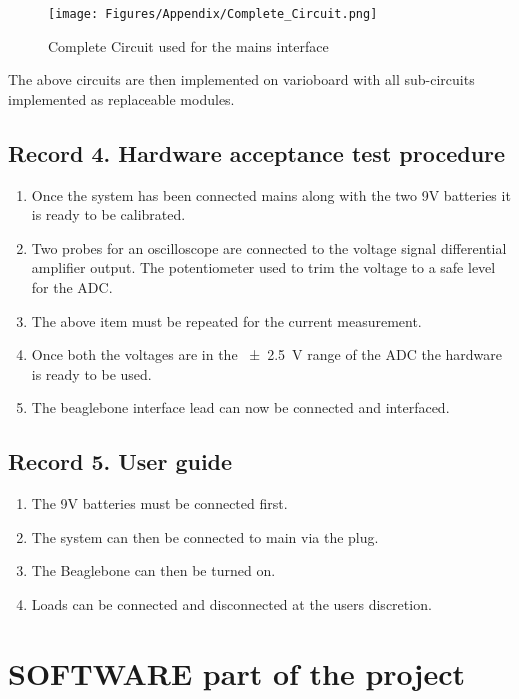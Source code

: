 \begin{figure}[H]
    \centering
    \texttt{[image: Figures/Appendix/Complete\_Circuit.png]}
    \caption{Complete Circuit used for the mains interface}
    \label{ap:Full}
\end{figure}

The above circuits are then implemented on varioboard with all sub-circuits implemented as replaceable modules.

\subsection{Record 4. Hardware acceptance test procedure}

\begin{enumerate}
    \item Once the system has been connected mains along with the two 9V batteries it is ready to be calibrated.
    \item Two probes for an oscilloscope are connected to the voltage signal differential amplifier output. The potentiometer used to trim the voltage to a safe level for the ADC.
    \item The above item must be repeated for the current measurement.
    \item Once both the voltages are in the \qty{\pm 2.5}{\volt} range of the ADC the hardware is ready to be used.
    \item The beaglebone interface lead can now be connected and interfaced.
\end{enumerate}
\subsection{Record 5. User guide}

\begin{enumerate}
    \item The 9V batteries must be connected first.
    \item The system can then be connected to main via the plug.
    \item The Beaglebone can then be turned on.
    \item Loads can be connected and disconnected at the users discretion. 
\end{enumerate}




\section{SOFTWARE part of the project}

